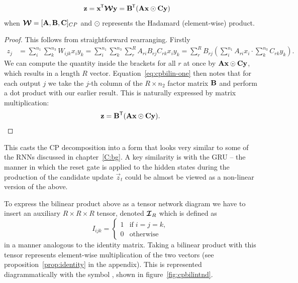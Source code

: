 \begin{prop} \label{prop:cpbilin}
\begin{align}
	\mathbf{z} &= \mathbf{x}^{\mkern-1.5mu\mathsf{T}}\bm{\mathcal{W}}\mathbf{y} 
			= \mathbf{B}^{\mkern-1.5mu\mathsf{T}}(\mathbf{A}\mathbf{x} \odot \mathbf{C}\mathbf{y})
\end{align}
when \(\bm{\mathcal{W}} = [\mathbf{A}, \mathbf{B}, \mathbf{C}]_{CP}\) and \(\odot\) represents the Hadamard
(element-wise) product.
\end{prop}
\begin{proof}
This follows from straightforward rearranging. Firstly
\begin{align}\label{eq:cpbilin-one}
	z_j &= \sum_{i}^{n_1} \sum_k^{n_3} W_{ijk} x_i y_k 
		= \sum_{i}^{n_1} \sum_k^{n_3} \sum_r^R A_{ri} B_{rj} C_{rk} x_i y_k
		= \sum_r^R B_{rj} \left( \sum_i^{n_1} A_{ri} x_i \cdot \sum_k^{n_3} C_{rk}y_k \right).
\end{align}
We can compute the quantity inside the brackets for all \(r\) at once
by \(\mathbf{A}\mathbf{x} \odot \mathbf{C}\mathbf{y}\), which results in a length \(R\) vector. 
Equation~\eqref{eq:cpbilin-one} then notes that for each output \(j\) we take the \(j\)-th column
of the \(R \times n_2\) factor matrix \(\mathbf{B}\) and perform a dot product with our earlier
result. This is naturally expressed by matrix multiplication:
\begin{equation}
	\mathbf{z} = \mathbf{B}^\mathsf{T} (\mathbf{A}\mathbf{x} \odot \mathbf{C}\mathbf{y}).
\end{equation}
\end{proof}

This casts the CP decomposition into a form that looks very similar to some of the
RNNs discussed in chapter~\ref{C:bg}. A key similarity is with the GRU -- the manner in which
the reset gate is applied to the hidden states during the production of the candidate update
\(\vec{z}_t\) could be almost be viewed as a non-linear version of the above.

To express the bilinear product above as a tensor network diagram  we have to insert
an auxiliary \(R\times R\times R\) tensor, denoted \(\bm{\mathcal{I}}_{R}\) which is defined as
\begin{equation}\label{eq:tensoridentity}
	I_{ijk} = \begin{cases}
		1 & \mathrm{if} \; i=j=k, \\
		0 & \mathrm{otherwise}
	\end{cases}
\end{equation} in a manner analogous to the identity matrix. Taking a bilinear product with this
tensor represents element-wise multiplication of the two vectors (see proposition~\ref{prop:identity}
in the appendix). This is
represented diagrammatically with the symbol
,
shown in 
figure~\ref{fig:cpbilintnd}.

